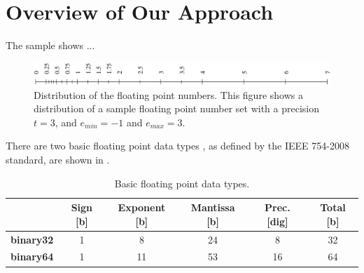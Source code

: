 \chapter{Overview of Our Approach}
\label{chap.ourapproach}

The sample  shows ...

\begin{figure}[htb]
\begin{center}
\includegraphics[width=.95\textwidth]{pic/float.pdf}
\end{center}
\caption{Distribution of the floating point numbers. This figure shows a distribution of a sample floating point number set with a precision $t=3$, and $e_{min}=-1$ and $e_{max}=3$.}
\label{fig.float}
\end{figure}


There are two basic floating point  data types , as defined by the IEEE 754-2008 \cite{ieee754} standard, are shown in .

\begin{table}[htb]
\begin{center}
\begin{tabular}{|r|c|c|c||c||c|}
\cline{2-6}

\multicolumn{1}{r|}{} & {\vrule height 13pt depth 6pt width 0pt\bf Sign} [b] & {\bf Exponent} [b] & {\bf Mantissa} [b] & {\bf Prec.} [dig] & {\bf Total} [b]\\ \cline{2-6}  \hline

\vrule height 10pt depth 20pt width 0pt
{\bf binary32}   			& 1    & 8        	& 24      & 8  	& 32\\ \hline

\vrule height 20pt depth 0pt width 1pt
{\bf binary64}   			& 1    & 11       	& 53      & 16	& 64\\ \hline
\end{tabular}
\end{center}
\caption{Basic floating point data types.}
\label{tab.floatingpointdatatypes}
\end{table}
